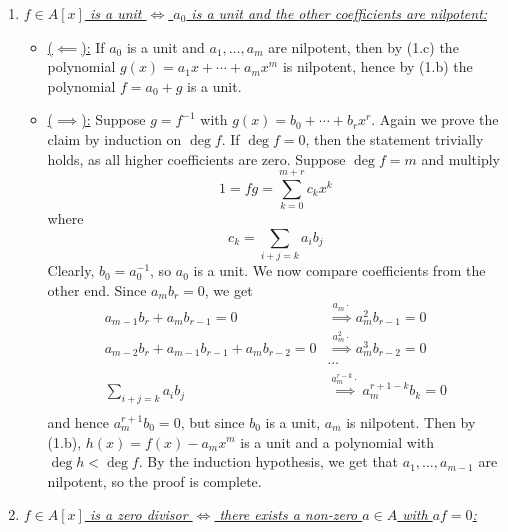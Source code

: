\documentclass[a4paper, 12pt]{article}
\begin{document}
\begin{Exercise}
\begin{enumerate}[label=(\alph*)]
\begin{itemize}
            \end{itemize}
        \item \underline{\emph{$f \in A[x]$ is a unit $\iff$ $a_0$ is a unit and the other coefficients are nilpotent:}}
            \begin{itemize}
                \item \underline{($\impliedby$):}
                    If $a_0$ is a unit and $a_1,\dots,a_m$ are nilpotent,
                    then by (1.c) the polynomial $g(x) = a_1x + \cdots + a_mx^m$ is nilpotent,
                    hence by (1.b) the polynomial $f = a_0 + g$ is a unit.
                \item \underline{($\implies$):}
                    Suppose $g = f^{-1}$ with $g(x) = b_0 + \cdots + b_rx^r$.
                    Again we prove the claim by induction on $\deg f$.
                    If $\deg f = 0$, then the statement trivially holds, as all higher coefficients are zero.
                    Suppose $\deg f = m$ and multiply
                    \[
                        1 = fg = \sum_{k=0}^{m+r}c_kx^k
                    \]
                    where
                    \[
                        c_k = \sum_{i+j=k}a_ib_j
                    \]
                    Clearly, $b_0 = a_0^{-1}$, so $a_0$ is a unit.
                    We now compare coefficients from the other end.
                    Since $a_mb_r = 0$, we get
                    \begin{align*}
                        a_{m-1}b_r + a_mb_{r-1} = 0 &\overset{a_m\cdot}{\implies} a_m^2b_{r-1} = 0 \\
                        a_{m-2}b_r + a_{m-1}b_{r-1} + a_mb_{r-2} = 0 &\overset{a_m^2\cdot}{\implies} a_m^3b_{r-2} = 0 \\
                        &\cdots \\
                        \sum_{i+j = k} a_ib_j &\overset{a_m^{r-k}\cdot}{\implies} a_m^{r+1-k}b_k = 0 \\
                    \end{align*}
                    and hence $a_m^{r+1}b_0 = 0$, but since $b_0$ is a unit, $a_m$ is nilpotent.
                    Then by (1.b), $h(x) = f(x) - a_mx^m$ is a unit and a polynomial with $\deg h < \deg f$.
                    By the induction hypothesis, we get that $a_1,\dots,a_{m-1}$ are nilpotent,
                    so the proof is complete.
            \end{itemize}
        \item \underline{\emph{$f \in A[x]$ is a zero divisor $\iff$ there exists a non-zero $a \in A$ with $af=0$:}}

\end{enumerate}
\end{Exercise}
\end{document}
